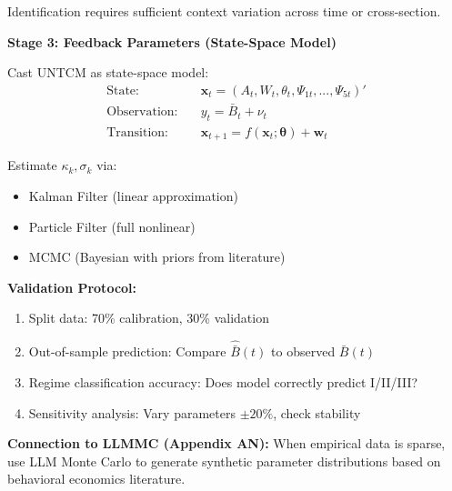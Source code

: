 \begin{tcolorbox}[colback=green!5!white, colframe=green!75!black,
    title=\textbf{Method UNTCM-M2: Parameter Calibration Protocol}]
Identification requires sufficient context variation across time or cross-section.

\textbf{Stage 3: Feedback Parameters (State-Space Model)}

Cast UNTCM as state-space model:
\begin{align}
\text{State:} \quad & \mathbf{x}_t = (A_t, W_t, \theta_t, \Psi_{1t}, ..., \Psi_{5t})' \\
\text{Observation:} \quad & y_t = \bar{B}_t + \nu_t \\
\text{Transition:} \quad & \mathbf{x}_{t+1} = f(\mathbf{x}_t; \boldsymbol{\theta}) + \mathbf{w}_t
\end{align}

Estimate $\kappa_k, \sigma_k$ via:
\begin{itemize}[nosep]
\item Kalman Filter (linear approximation)
\item Particle Filter (full nonlinear)
\item MCMC (Bayesian with priors from literature)
\end{itemize}

\textbf{Validation Protocol:}
\begin{enumerate}[nosep]
\item Split data: 70\% calibration, 30\% validation
\item Out-of-sample prediction: Compare $\hat{\bar{B}}(t)$ to observed $\bar{B}(t)$
\item Regime classification accuracy: Does model correctly predict I/II/III?
\item Sensitivity analysis: Vary parameters $\pm 20\%$, check stability
\end{enumerate}

\textbf{Connection to LLMMC (Appendix AN):}
When empirical data is sparse, use LLM Monte Carlo to generate synthetic parameter distributions based on behavioral economics literature.

\end{tcolorbox}

